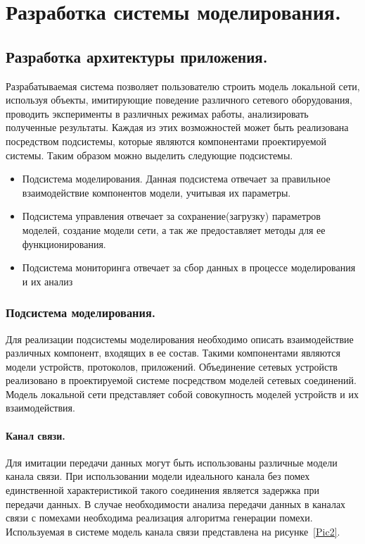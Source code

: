 \newpage

\chapter{Разработка системы моделирования.}
    \section{Разработка архитектуры приложения. }
    Разрабатываемая система позволяет пользователю строить  модель локальной сети, используя объекты, имитирующие поведение различного сетевого оборудования, проводить эксперименты в различных режимах работы, анализировать полученные результаты. Каждая из этих возможностей может быть реализована посредством подсистемы, которые являются компонентами проектируемой системы. Таким образом можно выделить следующие подсистемы.

    \begin{itemize}
        \item Подсистема моделирования. Данная подсистема отвечает за правильное взаимодействие компонентов модели, учитывая их параметры.
        \item Подсистема управления отвечает за сохранение(загрузку) параметров моделей, создание модели сети, а так же предоставляет методы для ее функционирования.
        \item Подсистема мониторинга отвечает за сбор данных в процессе моделирования и их анализ
    \end{itemize}

    \subsection{Подсистема моделирования. }

    Для реализации подсистемы моделирования необходимо описать взаимодействие различных компонент, входящих в ее состав. Такими компонентами являются модели устройств, протоколов, приложений. Объединение сетевых устройств реализовано в проектируемой системе посредством моделей сетевых соединений. Модель локальной сети представляет собой совокупность моделей устройств и их взаимодействия.

    \subsubsection{Канал связи. }

    Для имитации передачи данных могут быть использованы различные модели канала связи. При использовании модели идеального канала без помех единственной характеристикой такого соединения является задержка при передачи данных. В случае необходимости анализа передачи данных в каналах связи с помехами необходима реализация алгоритма генерации помехи. Используемая в системе модель канала связи представлена на рисунке~\ref{Pic2}.

